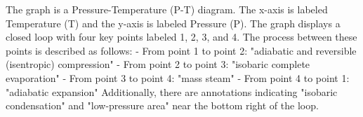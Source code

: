 The graph is a Pressure-Temperature (P-T) diagram. The x-axis is labeled Temperature (T) and the y-axis is labeled Pressure (P). The graph displays a closed loop with four key points labeled 1, 2, 3, and 4. The process between these points is described as follows:
- From point 1 to point 2: "adiabatic and reversible (isentropic) compression"
- From point 2 to point 3: "isobaric complete evaporation"
- From point 3 to point 4: "mass steam"
- From point 4 to point 1: "adiabatic expansion"
Additionally, there are annotations indicating "isobaric condensation" and "low-pressure area" near the bottom right of the loop.